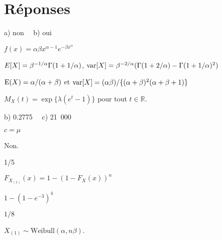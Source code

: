 \bigskip
\section*{Réponses}

\begin{reponse}{1.1}
a) non \, \, b) oui
\end{reponse}
\begin{reponse}{1.3}
    \begin{inparaenum}
    \item $f(x) = \alpha \beta x^{\alpha - 1}e^{-\beta x^{\alpha}}$
    \item $E [ X ] = \beta^{-1/\alpha} \Gamma(1 + 1/\alpha)$, %
      $\mathrm{var} [ X ] = \beta^{-2/\alpha} (\Gamma(1 + 2/\alpha) -
      \Gamma(1 + 1/\alpha)^2)$
    \end{inparaenum}
  
\end{reponse}
\begin{reponse}{1.4}
$\operatorname{E}(X)=\alpha/(\alpha+\beta)$ et $\mathrm{var}\! \left[ X \right]=(\alpha\beta)/\{(\alpha+\beta)^2(\alpha+\beta+1)\}$
\end{reponse}
\begin{reponse}{1.5}
$M_X(t) = \exp\{\lambda(e^t-1)\}$ pour tout $t \in \mathbb{R}$.
\end{reponse}
\begin{reponse}{1.6}
     b) 0.2775 \, \, c) 21~000
   
\end{reponse}
\begin{reponse}{1.7}
    $c = \mu$
  
\end{reponse}
\begin{reponse}{1.9}
Non.
\end{reponse}
\begin{reponse}{1.10}
1/5
\end{reponse}
\begin{reponse}{1.11}
    $F_{X_{(1)}}(x) = 1 - (1 -  F_X(x))^n$
  
\end{reponse}
\begin{reponse}{1.12}
    $1 - (1 - e^{-3})^4$
  
\end{reponse}
\begin{reponse}{1.13}
    $1/8$
  
\end{reponse}
\begin{reponse}{1.15}
    $X_{(1)} \sim \text{Weibull}(\alpha, n\beta)$.
  
\end{reponse}
